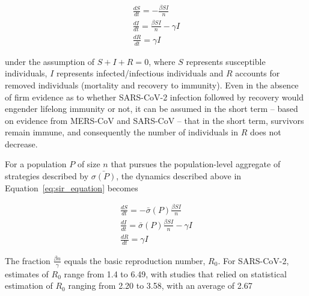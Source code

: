 \documentclass{article}
\begin{document}
\begin{equation}
	\begin{aligned}
		\frac{dS}{dt} = - \frac{\beta S I}{n} 								\\
		\frac{dI}{dt} = \frac{\beta S I}{n} - \gamma I 						\\
		\frac{dR}{dt} = \gamma I
	\end{aligned}
	\label{eq:sir_equation}
\end{equation}

\noindent under the assumption of $S + I + R = 0$, where $S$ represents susceptible individuals, $I$ represents infected/infectious individuals and $R$ accounts for removed individuals (mortality and recovery to immunity). Even in the absence of firm evidence as to whether SARS-CoV-2 infection followed by recovery would engender lifelong immunity or not,\cite{roy2020covid,ota2020will,lin2020duration} it can be assumed in the short term -- based on evidence from MERS-CoV and SARS-CoV -- that in the short term, survivors remain immune,\cite{prompetchara2020immune} and consequently the number of individuals in $R$ does not decrease.

For a population $P$ of size $n$ that pursues the population-level aggregate of strategies described by $\bar{\sigma(P)}$, the dynamics described above in Equation~\eqref{eq:sir_equation} becomes

\begin{equation}
	\begin{aligned}
		\frac{dS}{dt} = - \bar{\sigma}(P) \frac{\beta S I}{n} 				\\
		\frac{dI}{dt} = \bar{\sigma}(P) \frac{\beta S I}{n} - \gamma I 		\\
		\frac{dR}{dt} = \gamma I
	\end{aligned}
	\label{eq:sir_strat_equation}
\end{equation}

The fraction $\frac{\beta n}{\gamma}$ equals the basic reproduction number, $R_0$. For SARS-CoV-2, estimates of $R_0$ range from 1.4 to 6.49, with studies that relied on statistical estimation of $R_0$ ranging from 2.20 to 3.58, with an average of 2.67\cite{liu2020reproductive} 



\end{document}
